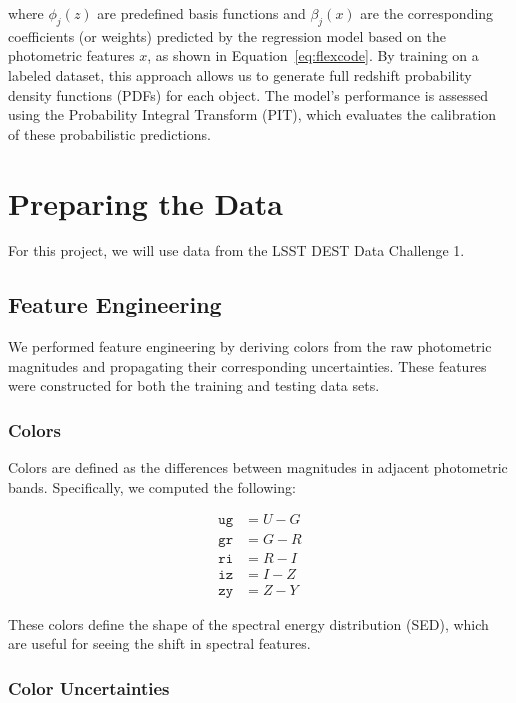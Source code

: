 \documentclass{article}
\begin{document}
where \( \phi_j(z) \) are predefined basis functions and \( \beta_j(x) \) are the corresponding coefficients (or weights) predicted by the regression model based on the photometric features \(x\), as shown in Equation~\ref{eq:flexcode}. By training on a labeled dataset, this approach allows us to generate full redshift probability density functions (PDFs) for each object. The model’s performance is assessed using the Probability Integral Transform (PIT), which evaluates the calibration of these probabilistic predictions.




\section*{Preparing the Data}

For this project, we will use data from the LSST DEST Data Challenge 1.

\subsection*{Feature Engineering}

We performed feature engineering by deriving colors from the raw photometric magnitudes and propagating their corresponding uncertainties. These features were constructed for both the training and testing data sets.

\subsubsection*{Colors}

Colors are defined as the differences between magnitudes in adjacent photometric bands. Specifically, we computed the following:

\begin{align*}
\texttt{ug} &= U - G \\
\texttt{gr} &= G - R \\
\texttt{ri} &= R - I \\
\texttt{iz} &= I - Z \\
\texttt{zy} &= Z - Y
\end{align*}

These colors define the shape of the spectral energy distribution (SED), which are useful for seeing the shift in spectral features.

\subsubsection*{Color Uncertainties}
\end{document}
